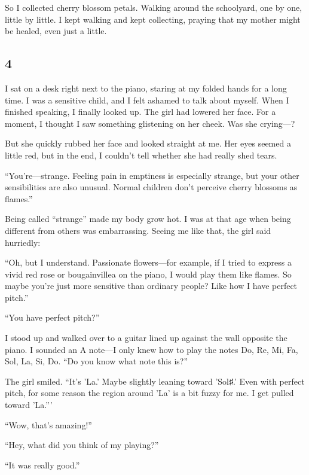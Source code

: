 \documentclass[
    a4paper,
    12pt,
    twoside,
    openany,
    UTF8,
    fontset=windows
]{ctexbook}
\begin{document}
So I collected cherry blossom petals. Walking around the schoolyard, one by one, little by little. I kept walking and kept collecting, praying that my mother might be healed, even just a little.


\subsection*{4}

I sat on a desk right next to the piano, staring at my folded hands for a long time. I was a sensitive child, and I felt ashamed to talk about myself. When I finished speaking, I finally looked up. The girl had lowered her face. For a moment, I thought I saw something glistening on her cheek. Was she crying---?

But she quickly rubbed her face and looked straight at me. Her eyes seemed a little red, but in the end, I couldn't tell whether she had really shed tears.

``You're---strange. Feeling pain in emptiness is especially strange, but your other sensibilities are also unusual. Normal children don't perceive cherry blossoms as flames.''

Being called ``strange'' made my body grow hot. I was at that age when being different from others was embarrassing. Seeing me like that, the girl said hurriedly:

``Oh, but I understand. Passionate flowers---for example, if I tried to express a vivid red rose or bougainvillea on the piano, I would play them like flames. So maybe you're just more sensitive than ordinary people? Like how I have perfect pitch.''

``You have perfect pitch?''

I stood up and walked over to a guitar lined up against the wall opposite the piano. I sounded an A note---I only knew how to play the notes Do, Re, Mi, Fa, Sol, La, Si, Do. ``Do you know what note this is?''

The girl smiled. ``It's 'La.' Maybe slightly leaning toward 'Sol♯.' Even with perfect pitch, for some reason the region around 'La' is a bit fuzzy for me. I get pulled toward 'La.'''

``Wow, that's amazing!''

``Hey, what did you think of my playing?''

``It was really good.''
\end{document}
